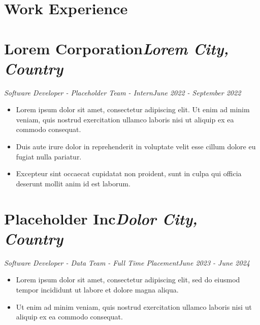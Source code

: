 \documentclass[8pt,letter]{article}%
\begin{document}
%
\vspace{0cm}%
\vspace{-0.2cm}%
\section*{\large\textbf{Work Experience}}%
\vspace{-0.5cm}%
\noindent\makebox[\linewidth]{\rule{\linewidth}{0.4pt}}%
\vspace{-0.16cm}%
\vspace{-0.4cm}%
\section*{\fontsize{10}{12}\selectfont\textbf{Lorem Corporation}\hfill\textit{Lorem City, Country}}%
\label{sec:fontsize1012selectfonttextbfLoremCorporationhfilltextitLoremCity,Country}%
\vspace{-0.3cm}\textit{Software Developer - Placeholder Team - Intern}\hfill\textit{June 2022 - September 2022}\vspace{-0.1cm}%
\begin{itemize}%
\item%
Lorem ipsum dolor sit amet, consectetur adipiscing elit. Ut enim ad minim veniam, quis nostrud exercitation ullamco laboris nisi ut aliquip ex ea commodo consequat.%
\item%
Duis aute irure dolor in reprehenderit in voluptate velit esse cillum dolore eu fugiat nulla pariatur.%
\item%
Excepteur sint occaecat cupidatat non proident, sunt in culpa qui officia deserunt mollit anim id est laborum.%
\end{itemize}

%
\vspace{0cm}%
\vspace{-0.4cm}%
\section*{\fontsize{10}{12}\selectfont\textbf{Placeholder Inc}\hfill\textit{Dolor City, Country}}%
\label{sec:fontsize1012selectfonttextbfPlaceholderInchfilltextitDolorCity,Country}%
\vspace{-0.3cm}\textit{Software Developer - Data Team - Full Time Placement}\hfill\textit{June 2023 - June 2024}\vspace{-0.1cm}%
\begin{itemize}%
\item%
Lorem ipsum dolor sit amet, consectetur adipiscing elit, sed do eiusmod tempor incididunt ut labore et dolore magna aliqua.%
\item%
Ut enim ad minim veniam, quis nostrud exercitation ullamco laboris nisi ut aliquip ex ea commodo consequat.%
\end{itemize}
\end{document}
